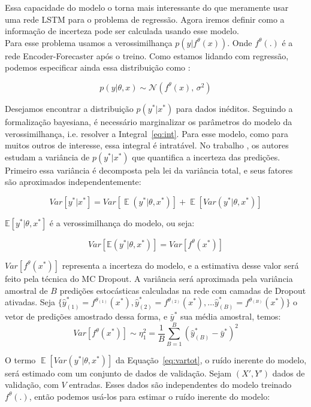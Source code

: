 Essa capacidade do modelo o torna mais interessante do que meramente usar uma
rede LSTM para o problema de regressão. Agora iremos definir como a informação
de incerteza pode ser calculada usando esse modelo. \\

Para esse problema usamos a verossimilhança $p(y |f^\theta(x))$.
Onde $f^\theta(.)$ é a rede Encoder-Forecaster após o treino.
Como estamos lidando com regressão, podemos especificar ainda essa distribuição
como \citep{ubertime}:  

\begin{equation}
  \label{eq:reg}
 p(y| \theta,x) \sim \mathcal{N}(f^{\theta}(x),\,\sigma^2)
\end{equation}

Desejamos encontrar a distribuição $p(y^*| x^*)$ para dados inéditos. Seguindo
a formalização bayesiana, é necessário marginalizar os parâmetros do modelo da
verossimilhança, i.e. resolver a Integral~\ref{eq:int}. Para esse modelo, como
para muitos outros de interesse, essa integral é intratável. No trabalho
\citep{ubertime}, os autores estudam a variância de $p(y^{*} | x^{*})$ que
quantifica a incerteza das predições. Primeiro essa variância é decomposta pela
lei da variância total, e seus fatores são aproximados independentemente: 

\begin{equation}
   Var[y^* | x^*] = Var[\mathop{\mathbb{E}}(y^* | \theta,x^*)] + \mathop{\mathbb{E}}[Var(y^* | \theta,x^*)]
   \label{eq:vartot}
 \end{equation}

$\mathbb{E}[y^* | \theta,x^*]$ é a verossimilhança do modelo, ou seja:

\[
  Var[\mathbb{E}(y^* | \theta,x^*)] = Var[f^\theta(x^*)]
\]


$Var[f^\theta(x^*)]$ representa a incerteza do modelo, e a estimativa desse valor será feito pela técnica do MC Dropout. A variância
será aproximada pela variância amostral de $B$ predições estocásticas calculadas
na rede com camadas de Dropout ativadas. Seja $\{\hat{y}^*_{(1)}=f^{\theta_{(1)}}(x^*),\hat{y}^*_{(2)}=f^{\theta_{(2)}}(x^*), \dots
\hat{y}^*_{(B)}=f^{\theta_{(B)}}(x^*)\}$ o vetor de predições amostrado dessa forma, e $\bar{y}^*$ sua
média amostral, temos: \\

\[   Var[f^\theta(x^*)] \sim \eta_1^2 = \frac{1}{B}\sum^B_{B=1}(\hat{y}^*_{(B)} - \bar{y}^*)^2  \]

O termo $\mathop{\mathbb{E}}[Var(y^* | \theta,x^*)]$ da Equação~\ref{eq:vartot}, o
ruído inerente do modelo, será estimado com um conjunto de dados de validação.
Sejam $(X',Y')$ dados de validação, com
$V$ entradas. Esses dados são independentes do modelo
treinado $f^\theta(.)$, então podemos usá-los para estimar o ruído inerente do
modelo: \\

